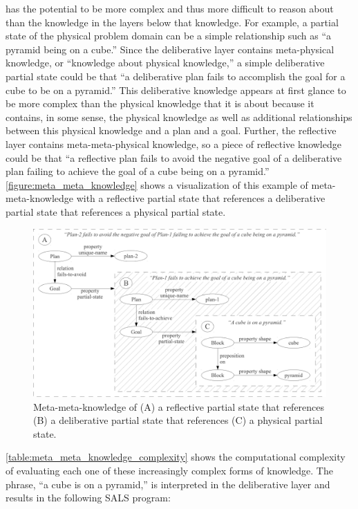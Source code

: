 has the potential to be more complex and thus more difficult to reason
about than the knowledge in the layers below that knowledge.  For
example, a partial state of the physical problem domain can be a
simple relationship such as ``a pyramid being on a cube.''  Since the
deliberative layer contains meta-physical knowledge, or ``knowledge
about physical knowledge,'' a simple deliberative partial state could
be that ``a deliberative plan fails to accomplish the goal for a cube
to be on a pyramid.''  This deliberative knowledge appears at first
glance to be more complex than the physical knowledge that it is about
because it contains, in some sense, the physical knowledge as well as
additional relationships between this physical knowledge and a plan
and a goal.  Further, the reflective layer contains meta-meta-physical
knowledge, so a piece of reflective knowledge could be that ``a
reflective plan fails to avoid the negative goal of a deliberative
plan failing to achieve the goal of a cube being on a pyramid.''
{\mbox{\autoref{figure:meta_meta_knowledge}}} shows a visualization of
this example of meta-meta-knowledge with a reflective partial state
that references a deliberative partial state that references a
physical partial state.
\begin{figure}
\centering
\includegraphics[width=12cm]{gfx/meta_meta_knowledge}
\caption{Meta-meta-knowledge of (A) a reflective partial state that
  references (B) a deliberative partial state that references (C) a
  physical partial state.}
\label{figure:meta_meta_knowledge}
\end{figure}
{\mbox{\autoref{table:meta_meta_knowledge_complexity}}} shows the
computational complexity of evaluating each one of these increasingly
complex forms of knowledge.  The phrase, ``a cube is on a pyramid,''
is interpreted in the deliberative layer and results in the following
SALS program:


